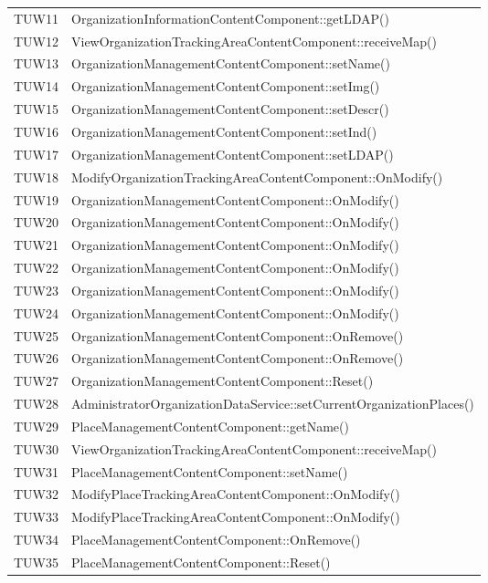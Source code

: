 {\begin{longtable}{C{2cm} C{12cm}}
		TUW11 & OrganizationInformationContentComponent::getLDAP() \\
		TUW12 & ViewOrganizationTrackingAreaContentComponent::receiveMap() \\
		TUW13 & OrganizationManagementContentComponent::setName() \\
		TUW14 & OrganizationManagementContentComponent::setImg() \\
		TUW15 & OrganizationManagementContentComponent::setDescr() \\
		TUW16 & OrganizationManagementContentComponent::setInd() \\
		TUW17 & OrganizationManagementContentComponent::setLDAP() \\
		TUW18 & ModifyOrganizationTrackingAreaContentComponent::OnModify() \\
		TUW19 & OrganizationManagementContentComponent::OnModify() \\
		TUW20 & OrganizationManagementContentComponent::OnModify() \\
		TUW21 & OrganizationManagementContentComponent::OnModify() \\
		TUW22 & OrganizationManagementContentComponent::OnModify() \\
		TUW23 & OrganizationManagementContentComponent::OnModify() \\
		TUW24 & OrganizationManagementContentComponent::OnModify() \\
		TUW25 & OrganizationManagementContentComponent::OnRemove() \\
		TUW26 & OrganizationManagementContentComponent::OnRemove() \\
		TUW27 & OrganizationManagementContentComponent::Reset() \\
		TUW28 & AdministratorOrganizationDataService::setCurrentOrganizationPlaces()\\
		TUW29 & PlaceManagementContentComponent::getName() \\
		TUW30 & ViewOrganizationTrackingAreaContentComponent::receiveMap() \\
		TUW31 & PlaceManagementContentComponent::setName() \\
		TUW32 & ModifyPlaceTrackingAreaContentComponent::OnModify() \\
		TUW33 & ModifyPlaceTrackingAreaContentComponent::OnModify() \\
		TUW34 & PlaceManagementContentComponent::OnRemove() \\
		TUW35 & PlaceManagementContentComponent::Reset() \\

\end{longtable}}
